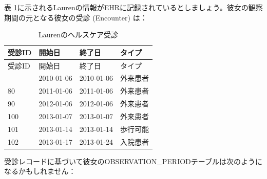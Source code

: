 \documentclass[
  11pt]{book}
\theoremstyle{definition}
\theoremstyle{definition}
\theoremstyle{definition}
\theoremstyle{definition}
\theoremstyle{remark}
\begin{document}
表 \ref{tab:encounters}に示されるLaurenの情報がEHRに記録されているとしましょう。彼女の観察期間の元となる彼女の受診 (Encounter) は：

\begin{longtable}[]{@{}llll@{}}
\caption{\label{tab:encounters} Laurenのヘルスケア受診}\tabularnewline
\toprule\noalign{}
受診ID & 開始日 & 終了日 & タイプ \\
\midrule\noalign{}
\endfirsthead
\toprule\noalign{}
受診ID & 開始日 & 終了日 & タイプ \\
\midrule\noalign{}
\endhead
\bottomrule\noalign{}
\endlastfoot
70 & 2010-01-06 & 2010-01-06 & 外来患者 \\
80 & 2011-01-06 & 2011-01-06 & 外来患者 \\
90 & 2012-01-06 & 2012-01-06 & 外来患者 \\
100 & 2013-01-07 & 2013-01-07 & 外来患者 \\
101 & 2013-01-14 & 2013-01-14 & 歩行可能 \\
102 & 2013-01-17 & 2013-01-24 & 入院患者 \\
\end{longtable}

受診レコードに基づいて彼女のOBSERVATION\_PERIODテーブルは次のようになるかもしれません：
\end{document}
